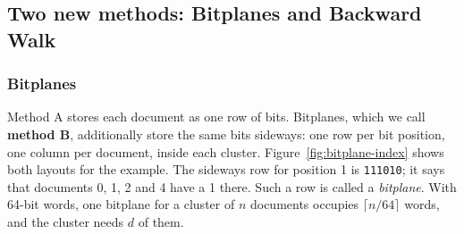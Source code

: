 \subsection{Two new methods: Bitplanes and Backward Walk}
\subsubsection{Bitplanes}
Method A stores each document as one row of bits. Bitplanes, which we call \textbf{method B},
additionally store the same bits sideways: one row per bit position, one column per document,
inside each cluster. Figure~\ref{fig:bitplane-index} shows both layouts for the example. The
sideways row for position 1 is \texttt{111010}; it says that documents 0, 1, 2 and 4 have a 1
there. Such a row is called a \emph{bitplane}. With 64-bit words, one bitplane for a cluster
of $n$ documents occupies $\lceil n/64\rceil$ words, and the cluster needs $d$ of them.

